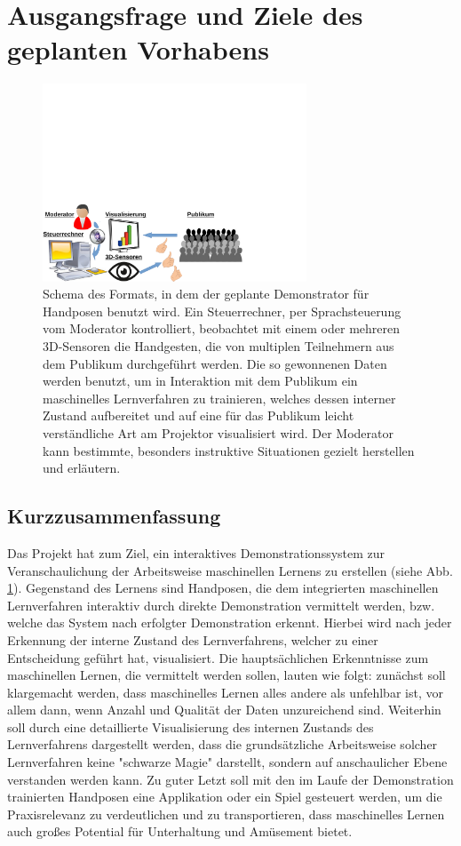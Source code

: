\documentclass[11pt]{article}
\begin{document}
\section{Ausgangsfrage und Ziele des geplanten Vorhabens}
%
\begin{figure}[t!]
\centering
\includegraphics[viewport=0in 0in 7.8in 3.5in,width=0.7\textwidth,clip]{setup.pdf}
\caption{\label{fig:setup}
Schema des Formats, in dem der geplante Demonstrator für Handposen benutzt wird. Ein Steuerrechner, per Sprachsteuerung vom Moderator kontrolliert, beobachtet mit einem oder mehreren 3D-Sensoren die Handgesten, die von multiplen Teilnehmern aus dem Publikum durchgeführt werden. Die so gewonnenen Daten werden benutzt, um in Interaktion mit dem Publikum ein maschinelles Lernverfahren zu trainieren, welches dessen interner Zustand aufbereitet und auf eine für das Publikum leicht verständliche Art am Projektor visualisiert wird. Der Moderator kann bestimmte, besonders instruktive Situationen gezielt herstellen und erläutern.
}
\end{figure}
\subsection{Kurzzusammenfassung}
Das Projekt hat zum Ziel, ein interaktives Demonstrationssystem zur Veranschaulichung der Arbeitsweise maschinellen Lernens zu erstellen (siehe Abb. \ref{fig:setup}).
Gegenstand des Lernens sind Handposen, die dem integrierten maschinellen Lernverfahren interaktiv durch direkte Demonstration vermittelt werden, bzw. welche das System nach
erfolgter Demonstration erkennt.  Hierbei wird nach jeder Erkennung der interne Zustand des Lernverfahrens, welcher zu einer Entscheidung geführt hat, visualisiert.
Die hauptsächlichen Erkenntnisse zum maschinellen Lernen, die vermittelt werden sollen, lauten wie folgt: zunächst soll klargemacht werden, dass maschinelles Lernen alles andere als unfehlbar ist, vor allem dann, wenn Anzahl und Qualität der Daten unzureichend sind. Weiterhin soll durch eine detaillierte Visualisierung des internen Zustands des Lernverfahrens dargestellt werden, dass die grundsätzliche Arbeitsweise solcher Lernverfahren keine "schwarze Magie" darstellt, sondern auf anschaulicher Ebene  verstanden werden kann.
Zu guter Letzt soll mit den im Laufe der Demonstration trainierten Handposen eine Applikation oder ein Spiel gesteuert werden, um die Praxisrelevanz zu verdeutlichen und zu transportieren, dass maschinelles Lernen auch großes Potential für Unterhaltung und Amüsement bietet.
%
\end{document}

